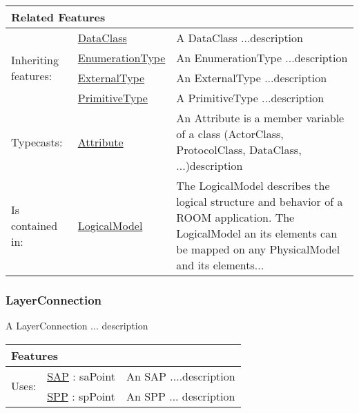 			\vspace{\baselineskip}
			\begingroup
			\renewcommand{\arraystretch}{1.8} %
			\parbox{\textwidth}{
			\begin{longtable}{l l p{}}
				\multicolumn{2}{l}{\textbf{\large Related Features}} & \\
				\hline
			\multirow{4}{*}{Inheriting features:} & \tabitem \hyperlink{ref:DataClass}{DataClass}  & A DataClass ...description \\
			& \tabitem \hyperlink{ref:EnumerationType}{EnumerationType}  & An EnumerationType ...description  \\
			& \tabitem \hyperlink{ref:ExternalType}{ExternalType}  & An ExternalType ...description  \\
			& \tabitem \hyperlink{ref:PrimitiveType}{PrimitiveType}  & A PrimitiveType ...description \\
			\hline
			Typecasts: & \tabitem \hyperlink{ref:Attribute}{Attribute}  & An Attribute is a member variable of a class (ActorClass, ProtocolClass, DataClass, ...)description \\
			\hline
			Is contained in: & \tabitem \hyperlink{ref:LogicalModel}{LogicalModel}  & The LogicalModel describes the logical structure and behavior of a ROOM application. The LogicalModel an its elements can be mapped on any PhysicalModel and its elements...\\
			\hline
			\end{longtable}	
			}
			\endgroup
			\vspace{\baselineskip}
			
			
		
		\subsubsection{LayerConnection}
			\hypertarget{ref:LayerConnection}{}
			
			A LayerConnection ... description 
			
			
			\vspace{\baselineskip}
			\begingroup
			\renewcommand{\arraystretch}{1.8} %
			\parbox{\textwidth}{
			\begin{longtable}{l l p{}}
				\multicolumn{2}{l}{\textbf{\large Features}} & \\
				\hline
			\multirow{2}{*}{Uses:} & \tabitem \hyperlink{ref:SAP}{SAP} : saPoint & An SAP ....description \\
			& \tabitem \hyperlink{ref:SPP}{SPP} : spPoint & An SPP ... description \\
			\hline
			\end{longtable}	
			}
			\endgroup
			\vspace{\baselineskip}
			
